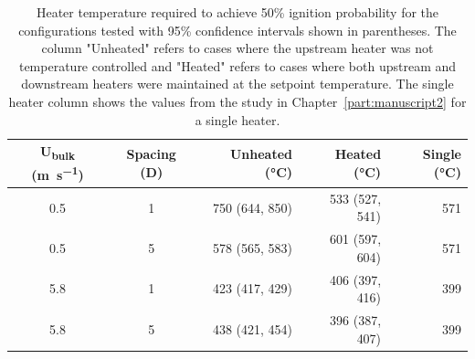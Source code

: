         \begin{table}[hpbt]
            \normalsize
            \caption{Heater temperature required to achieve 50\% ignition probability for the configurations tested with 95\% confidence intervals shown in parentheses. The column "Unheated" refers to cases where the upstream heater was not temperature controlled and "Heated" refers to cases where both upstream and downstream heaters were maintained at the setpoint temperature. The single heater column shows the values from the study in Chapter~\ref{part:manuscript2} for a single heater.}
            \centering
            \begin{tabular}{ccrrr}
                \rowcolor{gray!50}
               U\textsubscript{bulk} (\si{\meter\per\second}) & Spacing (D) & Unheated (\si{\celsius})& Heated (\si{\celsius}) & Single (\si{\celsius})\\
                \hline
                0.5  & 1 & 750 (644, 850) & 533 (527, 541) & 571\\
                0.5  & 5 & 578 (565, 583) & 601 (597, 604) & 571\\
                5.8  & 1 & 423 (417, 429) & 406 (397, 416) & 399\\
                5.8  & 5 & 438 (421, 454) & 396 (387, 407) & 399
            \end{tabular}
            \label{tab:multiFiftyTemp}
        \end{table}
        
